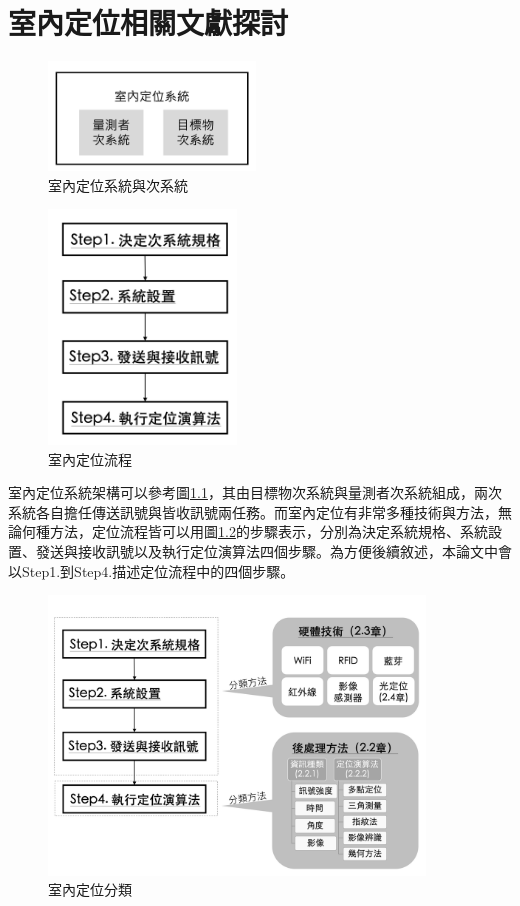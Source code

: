 \chapter{室內定位相關文獻探討}


\begin{figure}[htpb]
    \centering
    \includegraphics[width=5.5cm]{ch2pic/subsystem.png}
    \caption{室內定位系統與次系統}
    \label{pic:subsystem}
\end{figure}

\begin{figure}[htpb]
    \centering
    \includegraphics[width=5cm]{ch2pic/pos_flow.png}
    \caption{室內定位流程}
    \label{pic:pos_flow}
\end{figure}


室內定位系統架構可以參考圖\ref{pic:subsystem}，其由目標物次系統與量測者次系統組成，兩次系統各自擔任傳送訊號與皆收訊號兩任務。而室內定位有非常多種技術與方法，無論何種方法，定位流程皆可以用圖\ref{pic:pos_flow}的步驟表示，分別為決定系統規格、系統設置、發送與接收訊號以及執行定位演算法四個步驟。為方便後續敘述，本論文中會以Step1.到Step4.描述定位流程中的四個步驟。

\begin{figure}[htpb]
    \centering
    \includegraphics[width=10cm]{ch2pic/pos_category.png}
    \caption{室內定位分類}
    \label{pic:pos_category}
\end{figure}


